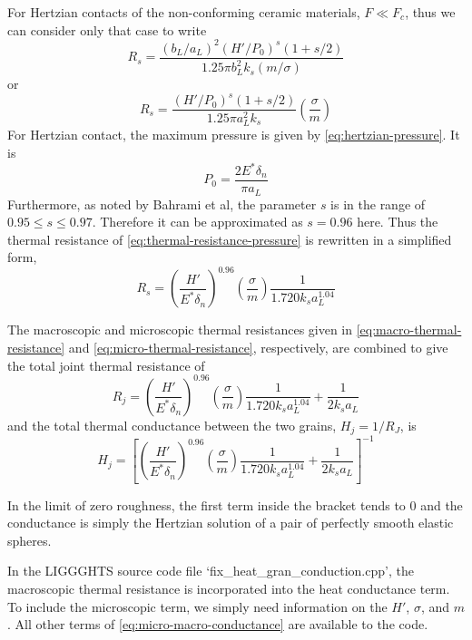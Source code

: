 For Hertzian contacts of the non-conforming ceramic materials, $F \ll F_c$, thus we can consider only that case to write
\begin{equation}
	R_s = \frac{(b_L/a_L)^2(H'/P_0)^s(1+s/2)}{1.25\pi b_L^2k_s(m/\sigma)}
\end{equation}
or
\begin{equation}\label{eq:thermal-resistance-pressure}
	R_s = \frac{(H'/P_0)^s(1+s/2)}{1.25\pi a_L^2k_s}\left(\frac{\sigma}{m}\right)
\end{equation}
For Hertzian contact, the maximum pressure is given by \cref{eq:hertzian-pressure}. It is
\begin{equation*}
	P_0 = \frac{2E^*\delta_n}{\pi a_L}
\end{equation*}
Furthermore, as noted by Bahrami et al, the parameter $s$ is in the range of $0.95\le s\le 0.97$. Therefore it can be approximated as $s=0.96$ here. Thus the thermal resistance of \cref{eq:thermal-resistance-pressure} is rewritten in a simplified form,
\begin{equation}\label{eq:micro-thermal-resistance}
	R_s = \left(\frac{H'}{E^*\delta_n}\right)^{0.96}\left(\frac{\sigma}{m}\right)\frac{1}{1.720k_sa_L^{1.04}}
\end{equation}

The macroscopic and microscopic thermal resistances given in \cref{eq:macro-thermal-resistance} and \cref{eq:micro-thermal-resistance}, respectively, are combined to give the total joint thermal resistance of
\begin{equation}
	R_j = \left(\frac{H'}{E^*\delta_n}\right)^{0.96}\left(\frac{\sigma}{m}\right)\frac{1}{1.720k_sa_L^{1.04}} + \frac{1}{2k_sa_L}
\end{equation}
and the total thermal conductance between the two grains, $H_j = 1/R_J$, is
\begin{equation}\label{eq:micro-macro-conductance}
	H_j = \left[\left(\frac{H'}{E^*\delta_n}\right)^{0.96}\left(\frac{\sigma}{m}\right)\frac{1}{1.720k_sa_L^{1.04}} + \frac{1}{2k_sa_L}\right]^{-1}
\end{equation}

In the limit of zero roughness, the first term inside the bracket tends to 0 and the conductance is simply the Hertzian solution of a pair of perfectly smooth elastic spheres.

In the LIGGGHTS source code file `fix\_heat\_gran\_conduction.cpp', the macroscopic thermal resistance is incorporated into the heat conductance term. To include the microscopic term, we simply need information on the $H'$, $\sigma$, and $m$. All other terms of \cref{eq:micro-macro-conductance} are available to the code.
